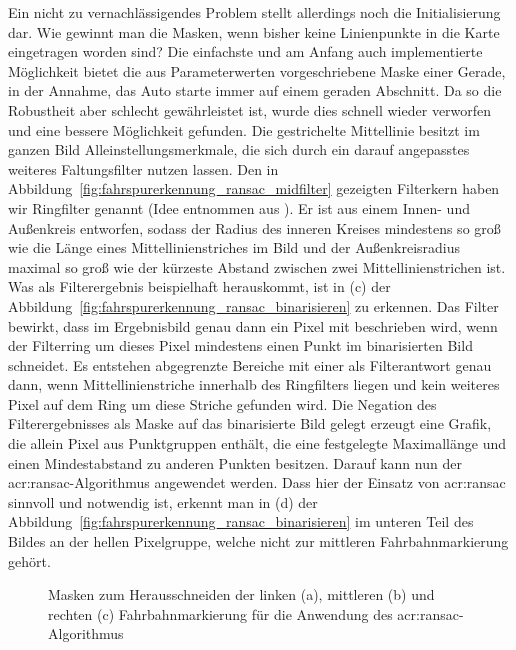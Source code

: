 Ein nicht zu vernachlässigendes Problem stellt allerdings noch die Initialisierung dar. Wie gewinnt man die Masken, wenn bisher keine Linienpunkte in die Karte eingetragen worden sind? Die einfachste und am Anfang auch implementierte Möglichkeit bietet die aus Parameterwerten vorgeschriebene Maske einer Gerade, in der Annahme, das Auto starte immer auf einem geraden Abschnitt. Da so die Robustheit aber schlecht gewährleistet ist, wurde dies schnell wieder verworfen und eine bessere Möglichkeit gefunden. Die gestrichelte Mittellinie besitzt im ganzen Bild Alleinstellungsmerkmale, die sich durch ein darauf angepasstes weiteres Faltungsfilter nutzen lassen. Den in Abbildung~\ref{fig:fahrspurerkennung_ransac_midfilter} gezeigten Filterkern haben wir \glqq Ringfilter\grqq{} genannt (Idee entnommen aus \autocite{drauschkeEchtzeitfaehigeStartpunktalgorithmenFuer2016}). Er ist aus einem Innen- und Außenkreis entworfen, sodass der Radius des inneren Kreises mindestens so groß wie die Länge eines Mittellinienstriches im Bild und der Außenkreisradius maximal so groß wie der kürzeste Abstand zwischen zwei Mittellinienstrichen ist. Was als Filterergebnis beispielhaft herauskommt, ist in (c) der Abbildung~\ref{fig:fahrspurerkennung_ransac_binarisieren} zu erkennen. Das Filter bewirkt, dass im Ergebnisbild genau dann ein Pixel mit \grqq{} beschrieben wird, wenn der Filterring um dieses Pixel mindestens einen Punkt im binarisierten Bild schneidet. Es entstehen abgegrenzte Bereiche mit einer \grqq{} als Filterantwort genau dann, wenn Mittellinienstriche innerhalb des \glqq Ringfilters\grqq{} liegen und kein weiteres Pixel auf dem Ring um diese Striche gefunden wird. Die Negation des Filterergebnisses als Maske auf das binarisierte Bild gelegt erzeugt eine Grafik, die allein Pixel aus Punktgruppen enthält, die eine festgelegte Maximallänge und einen Mindestabstand zu anderen Punkten besitzen. Darauf kann nun der \gls{acr:ransac}-Algorithmus angewendet werden. Dass hier der Einsatz von \gls{acr:ransac} sinnvoll und notwendig ist, erkennt man in (d) der Abbildung~\ref{fig:fahrspurerkennung_ransac_binarisieren} im unteren Teil des Bildes an der hellen Pixelgruppe, welche nicht zur mittleren Fahrbahnmarkierung gehört.

\begin{figure}[H]
	\centering
	\quad
	\quad
	\caption{Masken zum Herausschneiden der linken (a), mittleren (b) und rechten (c) Fahrbahnmarkierung für die Anwendung des \gls{acr:ransac}-Algorithmus}
	\label{fig:fahrspurerkennung_ransac_masken}
\end{figure} 

